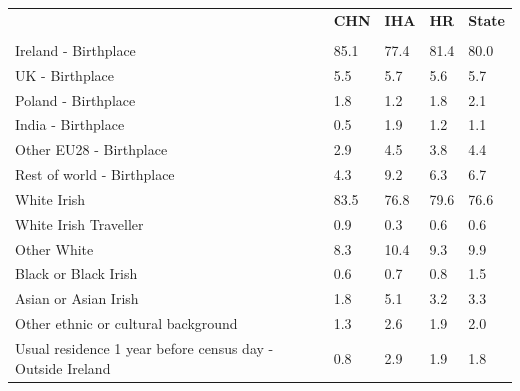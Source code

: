 \documentclass{article}
\begin{document}
\pagebreak
\begin{table}[h]	
\centering
		\begin{tabular}{KTTTT}
  \hline
& \textbf{CHN} & \textbf{IHA} & \textbf{HR}& \textbf{State}\\ 
  \hline
    \\ 
    \hline
Ireland - Birthplace & 85.1& 77.4& 81.4& 80.0\\
UK - Birthplace & 5.5& 5.7& 5.6& 5.7\\
Poland - Birthplace & 1.8& 1.2& 1.8& 2.1\\
India - Birthplace & 0.5& 1.9& 1.2& 1.1\\
Other EU28 - Birthplace & 2.9& 4.5& 3.8& 4.4\\
Rest of world - Birthplace & 4.3& 9.2& 6.3& 6.7\\
    \hline
White Irish & 83.5& 76.8& 79.6& 76.6\\
White Irish Traveller & 0.9& 0.3& 0.6& 0.6\\
Other White &  8.3& 10.4&  9.3&  9.9\\
Black or Black Irish & 0.6& 0.7& 0.8& 1.5\\
Asian or Asian Irish & 1.8& 5.1& 3.2& 3.3\\
Other ethnic or cultural background & 1.3& 2.6& 1.9& 2.0\\
    \hline
Usual residence 1 year before census day - Outside Ireland & 0.8& 2.9& 1.9& 1.8\\


\end{tabular}
\end{table}
\end{document}
